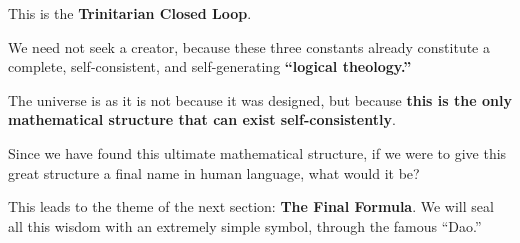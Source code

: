 This is the \textbf{Trinitarian Closed Loop}.

We need not seek a creator, because these three constants already constitute a complete, self-consistent, and self-generating \textbf{``logical theology.''}

The universe is as it is not because it was designed, but because \textbf{this is the only mathematical structure that can exist self-consistently}.

Since we have found this ultimate mathematical structure, if we were to give this great structure a final name in human language, what would it be?

This leads to the theme of the next section: \textbf{The Final Formula}. We will seal all this wisdom with an extremely simple symbol, through the famous ``Dao.''

